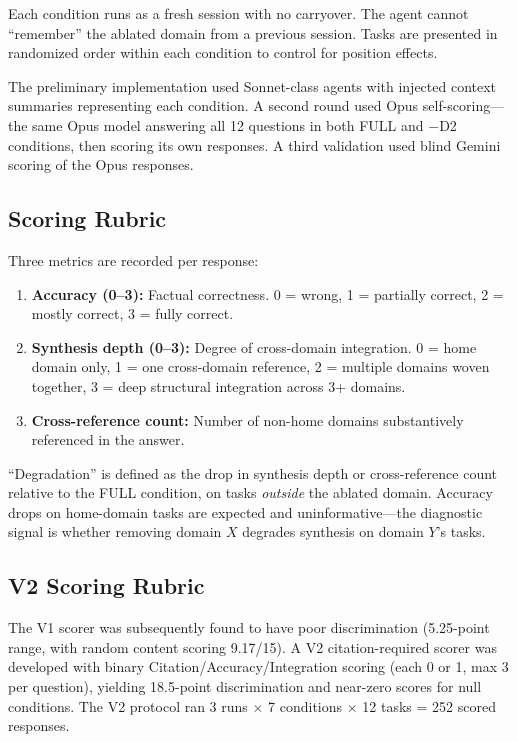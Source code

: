 \documentclass[12pt,letterpaper]{article}
\begin{document}
Each condition runs as a fresh session with no carryover. The agent cannot ``remember'' the ablated domain from a previous session. Tasks are presented in randomized order within each condition to control for position effects.

The preliminary implementation used Sonnet-class agents with injected context summaries representing each condition. A second round used Opus self-scoring---the same Opus model answering all 12 questions in both FULL and $-$D2 conditions, then scoring its own responses. A third validation used blind Gemini scoring of the Opus responses.

\subsection{Scoring Rubric}

Three metrics are recorded per response:

\begin{enumerate}[nosep]
  \item \textbf{Accuracy (0--3):} Factual correctness. 0 = wrong, 1 = partially correct, 2 = mostly correct, 3 = fully correct.
  \item \textbf{Synthesis depth (0--3):} Degree of cross-domain integration. 0 = home domain only, 1 = one cross-domain reference, 2 = multiple domains woven together, 3 = deep structural integration across 3+ domains.
  \item \textbf{Cross-reference count:} Number of non-home domains substantively referenced in the answer.
\end{enumerate}

``Degradation'' is defined as the drop in synthesis depth or cross-reference count relative to the FULL condition, on tasks \emph{outside} the ablated domain. Accuracy drops on home-domain tasks are expected and uninformative---the diagnostic signal is whether removing domain $X$ degrades synthesis on domain $Y$'s tasks.

\subsection{V2 Scoring Rubric}

The V1 scorer was subsequently found to have poor discrimination (5.25-point range, with random content scoring 9.17/15). A V2 citation-required scorer was developed with binary Citation/Accuracy/Integration scoring (each 0 or 1, max 3 per question), yielding 18.5-point discrimination and near-zero scores for null conditions. The V2 protocol ran 3 runs $\times$ 7 conditions $\times$ 12 tasks = 252 scored responses.
\end{document}
